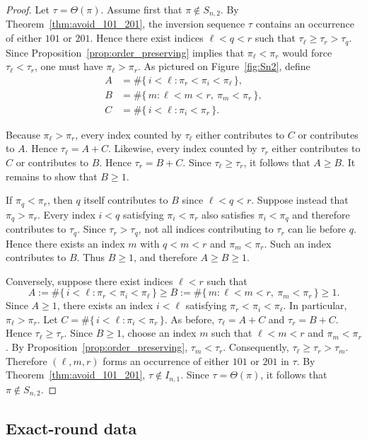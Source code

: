 \documentclass[11pt]{article}
\theoremstyle{remark}
\theoremstyle{definition}
\begin{document}
\begin{proof}
Let $\tau=\Theta(\pi)$. Assume first that $\pi\notin S_{n,2}$. By
Theorem~\ref{thm:avoid_101_201}, the inversion sequence $\tau$
contains an occurrence of either $101$ or $201$. Hence there exist indices $\ell<q<r$ such that $\tau_\ell\ge\tau_r>\tau_q$.
Since Proposition~\ref{prop:order_preserving} implies that
$\pi_\ell<\pi_r$ would force $\tau_\ell<\tau_r$, one must have
$\pi_\ell>\pi_r$. As pictured on Figure~\ref{fig:Sn2}, define
\begin{align*}
A&=\#\{\,i<\ell:\pi_r<\pi_i<\pi_\ell\,\},\\
B&=\#\{\,m:\ell<m<r,\ \pi_m<\pi_r\,\},\\
C&=\#\{\,i<\ell:\pi_i<\pi_r\,\}.
\end{align*}

Because $\pi_\ell>\pi_r$, every index counted by $\tau_\ell$
either contributes to $C$ or contributes to $A$. Hence
$\tau_\ell=A+C$. Likewise, every index counted by $\tau_r$
either contributes to $C$ or contributes to $B$. Hence
$\tau_r=B+C$. Since $\tau_\ell\ge\tau_r$, it follows that
$A\ge B$. It remains to show that $B\ge1$.

If $\pi_q<\pi_r$, then $q$ itself contributes to $B$ since
$\ell<q<r$. Suppose instead that $\pi_q>\pi_r$. Every index $i<q$ satisfying $\pi_i<\pi_r$ also satisfies $\pi_i<\pi_q$ and
therefore contributes to $\tau_q$. Since $\tau_r>\tau_q$,
not all indices contributing to $\tau_r$ can lie before $q$.
Hence there exists an index $m$ with $q<m<r$ and
$\pi_m<\pi_r$. Such an index contributes to $B$. Thus $B\ge1$, and therefore $A\ge B\ge1$.

Conversely, suppose there exist indices $\ell<r$ such that
\[
A:=\#\{\,i<\ell:\pi_r<\pi_i<\pi_\ell\,\} \ge B:=\#\{\,m:\ell<m<r,\ \pi_m<\pi_r\,\}\ge1.
\]
Since $A\ge1$, there exists an index $i<\ell$ satisfying
$\pi_r<\pi_i<\pi_\ell$. In particular, $\pi_\ell>\pi_r$. Let
$ C=\#\{\,i<\ell:\pi_i<\pi_r\,\}.$
As before,
$\tau_\ell=A+C$
and
$\tau_r=B+C$.
Hence $\tau_\ell\ge\tau_r$. Since $B\ge1$, choose an index $m$ such that
$\ell<m<r$ and $\pi_m<\pi_r$.
By Proposition~\ref{prop:order_preserving},
$\tau_m<\tau_r$.
Consequently, $\tau_\ell\ge\tau_r>\tau_m$. Therefore $(\ell,m,r)$ forms an occurrence of either $101$ or $201$
in $\tau$. By Theorem~\ref{thm:avoid_101_201},
$\tau\notin I_{n,1}$.
Since $\tau=\Theta(\pi)$, it follows that
$\pi\notin S_{n,2}$.
\end{proof}

\subsection{Exact-round data}
\end{document}
